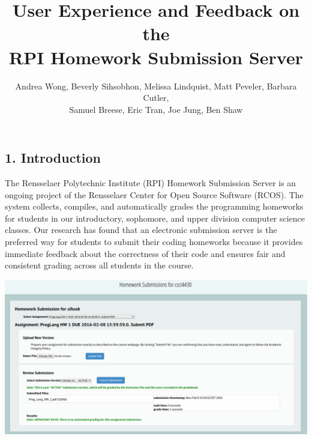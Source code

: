 \documentclass[thesis]{hmcposter}
\title{User Experience and Feedback on the\\
\vspace{-0.1in}
RPI Homework Submission Server}
\author{Andrea Wong, Beverly Sihsobhon, Melissa Lindquist, Matt Peveler, Barbara Cutler, \\
\vspace{-0.7in}
Samuel Breese, Eric Tran, Joe Jung, Ben Shaw}
\begin{document}
\begin{poster}

\section{1. Introduction}

The Rensselaer Polytechnic Institute (RPI) Homework Submission Server
is an ongoing project of the Rensselaer Center for Open Source
Software (RCOS). The system collects, compiles, and automatically
grades the programming homeworks for students in our introductory,
sophomore, and upper division computer science classes.  Our research
has found that an electronic submission server is the preferred way
for students to submit their coding homeworks because it provides
immediate feedback about the correctness of their code and ensures
fair and consistent grading across all students in the course.

\begin{center}
\includegraphics[width=12in]{HSS_prog_lang}
\end{center}


\end{poster}
\end{document}
